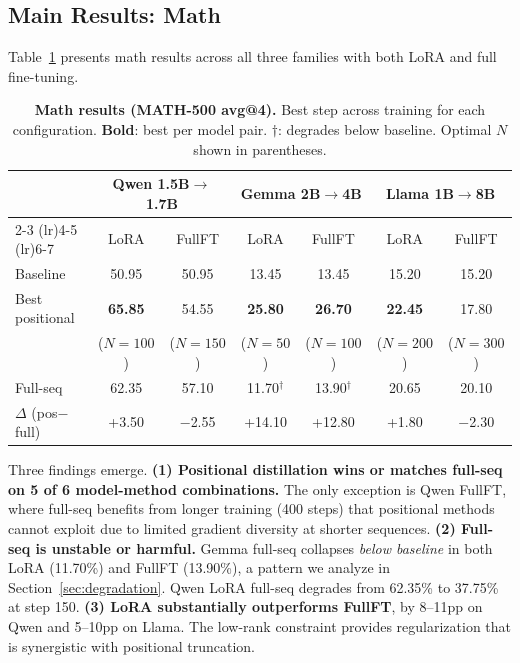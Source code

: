 \documentclass[10pt]{article}
\begin{document}
\subsection{Main Results: Math}
\label{sec:cross_family}

Table~\ref{tab:math_main} presents math results across all three families with both LoRA and full fine-tuning.

\begin{table}[t]
\centering
\caption{\textbf{Math results (MATH-500 avg@4).} Best step across training for each configuration. \textbf{Bold}: best per model pair. $\dagger$: degrades below baseline. Optimal $N$ shown in parentheses.}
\label{tab:math_main}
\small
\begin{tabular}{l cc cc cc}
\toprule
& \multicolumn{2}{c}{\textbf{Qwen 1.5B$\to$1.7B}} & \multicolumn{2}{c}{\textbf{Gemma 2B$\to$4B}} & \multicolumn{2}{c}{\textbf{Llama 1B$\to$8B}} \\
\cmidrule(lr){2-3} \cmidrule(lr){4-5} \cmidrule(lr){6-7}
& LoRA & FullFT & LoRA & FullFT & LoRA & FullFT \\
\midrule
Baseline & 50.95 & 50.95 & 13.45 & 13.45 & 15.20 & 15.20 \\
\midrule
Best positional & \textbf{65.85} & 54.55 & \textbf{25.80} & \textbf{26.70} & \textbf{22.45} & 17.80 \\
& \footnotesize{($N{=}100$)} & \footnotesize{($N{=}150$)} & \footnotesize{($N{=}50$)} & \footnotesize{($N{=}100$)} & \footnotesize{($N{=}200$)} & \footnotesize{($N{=}300$)} \\
Full-seq & 62.35 & 57.10 & 11.70$^\dagger$ & 13.90$^\dagger$ & 20.65 & 20.10 \\
\midrule
$\Delta$ (pos$-$full) & +3.50 & $-$2.55 & +14.10 & +12.80 & +1.80 & $-$2.30 \\
\bottomrule
\end{tabular}
\end{table}

Three findings emerge. \textbf{(1) Positional distillation wins or matches full-seq on 5 of 6 model-method combinations.} The only exception is Qwen FullFT, where full-seq benefits from longer training (400 steps) that positional methods cannot exploit due to limited gradient diversity at shorter sequences. \textbf{(2) Full-seq is unstable or harmful.} Gemma full-seq collapses \emph{below baseline} in both LoRA (11.70\%) and FullFT (13.90\%), a pattern we analyze in Section~\ref{sec:degradation}. Qwen LoRA full-seq degrades from 62.35\% to 37.75\% at step 150. \textbf{(3) LoRA substantially outperforms FullFT}, by 8--11pp on Qwen and 5--10pp on Llama. The low-rank constraint provides regularization that is synergistic with positional truncation.
\end{document}
